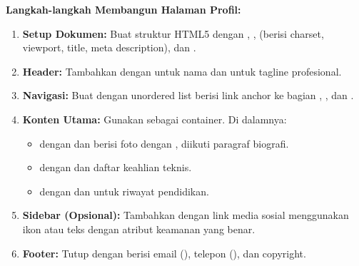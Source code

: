 \begin{contoh}
\textbf{Langkah-langkah Membangun Halaman Profil:}

\begin{enumerate}[leftmargin=*]
  \item \textbf{Setup Dokumen:} Buat struktur HTML5 dengan , ,  (berisi charset, viewport, title, meta description), dan .
  
  \item \textbf{Header:} Tambahkan  dengan  untuk nama dan  untuk tagline profesional.
  
  \item \textbf{Navigasi:} Buat  dengan unordered list berisi link anchor ke bagian , , dan .
  
  \item \textbf{Konten Utama:} Gunakan  sebagai container. Di dalamnya:
  \begin{itemize}
    \item {} dengan  dan  berisi foto dengan , diikuti paragraf biografi.
    \item {} dengan  dan  daftar keahlian teknis.
    \item {} dengan  dan  untuk riwayat pendidikan.
  \end{itemize}
  
  \item \textbf{Sidebar (Opsional):} Tambahkan  dengan link media sosial menggunakan ikon atau teks dengan atribut keamanan yang benar.
  
  \item \textbf{Footer:} Tutup dengan  berisi email (), telepon (), dan copyright.
\end{enumerate}
\end{contoh}

